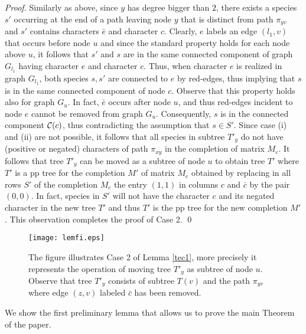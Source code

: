 \documentclass{llncs}
\begin{document}
\begin{proof}
Similarly as above, since $y$ has degree bigger than $2$, there exists a species $s'$ occurring at the end of a path leaving node $y$  that is distinct from path $\pi_{yv}$ and $s'$ contains characters $\bar{e}$ and character $c$. Clearly, $e$ labels an edge $(l_1, v)$ that occurs  before node $u$ and since the standard property holds for each node above $u$,  it follows that $s'$ and $s$ are in the same connected component of graph $G_{l_1}$    having character $e$ and character $c$. Thus, when character $e$ is realized in graph $G_{l_1}$, both species $s, s'$ are connected to $e$ by  red-edges, thus implying that $s$ is in the same connected component of  node $c$.  Observe that  this property holds also for graph $G_u$. In fact, $\bar{e}$ occurs after node $u$, and thus red-edges incident to node $e$  cannot be removed from   graph $G_u$.  Consequently, $s$ is in the connected component ${\cal C}(c)$, thus    contradicting the assumption that $s \in S'$. Since case (i) and (ii) are not possible, it follows that all species in subtree $T'_y$ do not have (positive or negated) characters of path  ${\pi}_{xy}$ in the completion of matrix $M_e$. It follows that tree $T'_y$ can be moved as a subtree of node $u$ to obtain tree $T'$ where $T'$ is a pp tree for the completion $M'$  of matrix $M_e$ obtained by replacing in all rows $S'$ of the completion $M_c$ the   entry  $(1,1)$ in columns $c$ and $\bar{c}$ by the pair $(0,0)$.  In fact, species in $S'$ will not have  the character $c$ and its negated character in the new tree $T'$ and thus $T'$ is the pp tree for the new completion $M'$. This observation completes the proof of Case 2.  \qed



\end{proof}


\begin{figure}[ptb]
\begin{center}
\texttt{[image: lemfi.eps]}
\end{center}
\caption{The figure illustrates Case 2 of  Lemma \ref{tec1}, more precisely it represents the operation of  moving tree $T'_y$  as subtree of node $u$. Observe that tree $T'_y$ consists of subtree $T(v)$  and the path $\pi_{yv}$ where edge $(z,v)$ labeled $\bar{c}$ has been removed.}
\label{lemfi}
\end{figure}


We show the first preliminary lemma that allows us to prove the main Theorem of the paper.
\end{document}
